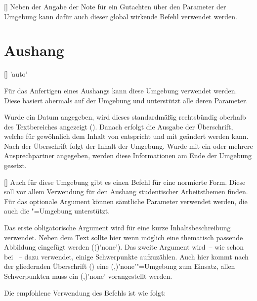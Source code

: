 \begin{Bundle*}{}
\begin{Declaration}{[]}
\printdeclarationlist%
%
Neben der Angabe der Note für ein Gutachten über den Parameter 
 der Umgebung  
kann dafür auch dieser global wirkende Befehl verwendet werden.
\end{Declaration}


\section{Aushang}
%
%
\begin{Declaration}{[]}{%
  'auto'%
}
\begin{Declaration}{}
\printdeclarationlist%
%
Für das Anfertigen eines Aushangs kann diese Umgebung verwendet werden. Diese 
basiert abermals auf der Umgebung  und unterstützt alle 
deren Parameter.

Wurde ein Datum angegeben, wird dieses standardmäßig rechtsbündig oberhalb des 
Textbereiches angezeigt (). Danach 
erfolgt die Ausgabe der Überschrift, welche für gewöhnlich dem Inhalt von 
 entspricht und mit  
geändert werden kann. Nach der Überschrift folgt der Inhalt der Umgebung. Wurde 
mit  ein oder mehrere Ansprechpartner angegeben, werden 
diese Informationen am Ende der Umgebung gesetzt.
\end{Declaration}
\end{Declaration}

\begin{Declaration}{%
  [\LParameter{}]%
}
\printdeclarationlist%
%
Auch für diese Umgebung gibt es einen Befehl für eine normierte Form. Diese 
soll vor allem Verwendung für den Aushang studentischer Arbeitsthemen finden. 
Für das optionale Argument können sämtliche Parameter verwendet werden, die 
auch die "=Umgebung unterstützt.

Das erste obligatorische Argument wird für eine kurze Inhaltsbeschreibung 
verwendet. Neben dem Text sollte hier wenn möglich eine thematisch passende 
Abbildung eingefügt werden (()'none'). 
Das zweite Argument wird~-- wie schon bei ~-- dazu verwendet, 
einige Schwerpunkte aufzuzählen. Auch hier kommt nach der gliedernden 
Überschrift () eine 
(,)'none'"=Umgebung
zum Einsatz, allen Schwerpunkten muss ein 
(,)'none' vorangestellt 
werden.
\end{Declaration}
%
\begin{Example}
Die empfohlene Verwendung des Befehls  ist wie folgt:
\begin{Code}[escapechar=§]
\end{Code}
\end{Example}
\end{Bundle*}
